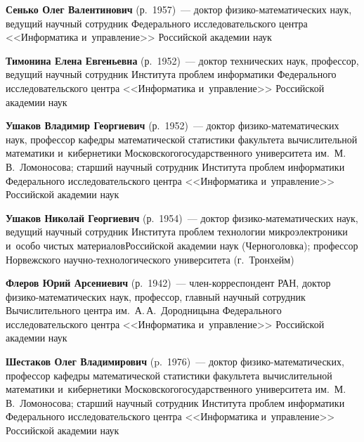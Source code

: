 \begin{multicols}{2}
 \noindent
\textbf{Сенько Олег Валентинович} (р.\ 1957)~--- 
доктор фи\-зи\-ко-ма\-те\-ма\-ти\-че\-ских наук, 
ведущий научный сотрудник Федерального исследовательского центра 
<<Информатика и~управ\-ле\-ние>> Российской академии наук

\vspace*{3pt}



\noindent
\textbf{Тимонина Елена Евгеньевна} (р.\ 1952)~--- 
доктор технических наук, профессор, ведущий научный сотруд\-ник Института проб\-лем 
информатики Федерального исследовательского центра <<Информатика и~управ\-ле\-ние>> 
Российской академии наук

\vspace*{3pt}


\noindent
\textbf{Ушаков Владимир Георгиевич} (р.\ 1952)~--- доктор 
фи\-зи\-ко-ма\-те\-ма\-ти\-че\-ских наук, 
профессор кафедры математической статистики факультета вычислительной математики 
и~кибернетики 
Московского\linebreak государственного университета им.\ М.\,В.~Ломоносова; 
старший научный сотрудник Института \mbox{проблем} информатики Федерального 
исследовательского центра <<Информатика и~управ\-ле\-ние>> Российской академии наук

\vspace*{3pt}


\noindent
\textbf{Ушаков Николай Георгиевич} (р.\ 1954)~--- доктор 
фи\-зи\-ко-ма\-те\-ма\-ти\-че\-ских наук, ведущий научный сотрудник 
Института проб\-лем технологии микроэлектроники 
и~особо чистых материалов\linebreak \mbox{Российской} академии наук (Черноголовка); 
профессор Норвежского на\-уч\-но-тех\-но\-ло\-ги\-че\-ско\-го университета (г.~Тронхейм)

\vspace*{3pt}


\noindent
\textbf{Флеров Юрий Арсениевич} (р.\ 1942)~--- член-кор\-рес\-пон\-дент РАН, 
доктор фи\-зи\-ко-ма\-те\-ма\-ти\-че\-ских наук, профессор, 
главный научный сотрудник Вы\-чис\-ли\-тель\-но\-го центра им.\ А.\,А.~Дородницына Федерального исследовательского 
цент\-ра <<Информатика и~управление>> Российской академии наук

\vspace*{3pt}


\noindent
\textbf{Шестаков Олег Владимирович} (p.\ 1976)~--- 
доктор фи\-зи\-ко-ма\-те\-ма\-ти\-че\-ских, 
профессор кафедры математической статистики факультета вычислительной математики 
и~кибернетики Московского\linebreak государственного университета им.\ М.\,В.~Ломо\-носова; 
старший научный сотрудник Института \mbox{проб\-лем} информатики Федерального 
исследовательского центра <<Информатика и~управ\-ле\-ние>> Российской академии наук




\end{multicols}
